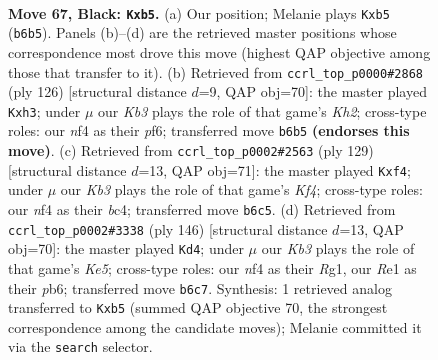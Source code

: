 \documentclass[11pt]{article}
\begin{document}
\clearpage

\begin{figure}[p]\centering
\begin{subfigure}{0.46\textwidth}\centering
\resizebox{\linewidth}{!}{%
\newchessgame
\chessboard[
  setfen={8/8/Rk6/1P6/5N2/8/2K3P1/4r3 b - - 4 67},
  showmover=false,
  pgfstyle=straightmove, color=movearrow, markmove={b6-b5}
]}
\caption{}
\end{subfigure}\hfill
\begin{subfigure}{0.46\textwidth}\centering
\resizebox{\linewidth}{!}{%
\newchessgame
\chessboard[
  setfen={8/8/5p2/5k2/3R4/7p/6rK/8 w - - 12 64},
  showmover=false,
  pgfstyle=straightmove, color=movearrow, markmove={h2-h3}
]}
\caption{}
\end{subfigure}
\\[4pt]
\begin{subfigure}{0.46\textwidth}\centering
\resizebox{\linewidth}{!}{%
\newchessgame
\chessboard[
  setfen={8/8/2K5/4Rk2/2B2P2/bP6/3r4/8 b - - 2 65},
  showmover=false,
  pgfstyle=straightmove, color=movearrow, markmove={f5-f4}
]}
\caption{}
\end{subfigure}\hfill
\begin{subfigure}{0.46\textwidth}\centering
\resizebox{\linewidth}{!}{%
\newchessgame
\chessboard[
  setfen={8/3k4/1p2p1P1/4Kr2/1p6/8/8/6R1 w - - 3 74},
  showmover=false,
  pgfstyle=straightmove, color=movearrow, markmove={e5-d4}
]}
\caption{}
\end{subfigure}
\caption{\textbf{Move 67, Black: \texttt{Kxb5}.} (a) Our position; Melanie plays \texttt{Kxb5} (\texttt{b6b5}). Panels (b)--(d) are the retrieved master positions whose correspondence most drove this move (highest QAP objective among those that transfer to it). (b) Retrieved from \texttt{ccrl\_top\_p0000\#2868} (ply 126) [structural distance $d$=9, QAP obj=70]: the master played \texttt{Kxh3}; under $\mu$ our \emph{Kb3} plays the role of that game's \emph{Kh2}; cross-type roles: our \emph{n}f4 as their \emph{p}f6; transferred move \texttt{b6b5} \textbf{(endorses this move)}. (c) Retrieved from \texttt{ccrl\_top\_p0002\#2563} (ply 129) [structural distance $d$=13, QAP obj=71]: the master played \texttt{Kxf4}; under $\mu$ our \emph{Kb3} plays the role of that game's \emph{Kf4}; cross-type roles: our \emph{n}f4 as their \emph{b}c4; transferred move \texttt{b6c5}. (d) Retrieved from \texttt{ccrl\_top\_p0002\#3338} (ply 146) [structural distance $d$=13, QAP obj=70]: the master played \texttt{Kd4}; under $\mu$ our \emph{Kb3} plays the role of that game's \emph{Ke5}; cross-type roles: our \emph{n}f4 as their \emph{R}g1, our \emph{R}e1 as their \emph{p}b6; transferred move \texttt{b6c7}. Synthesis: 1 retrieved analog transferred to \texttt{Kxb5} (summed QAP objective 70, the strongest correspondence among the candidate moves); Melanie committed it via the \texttt{search} selector.}
\label{fig:thought-m133}
\end{figure}
\end{document}
